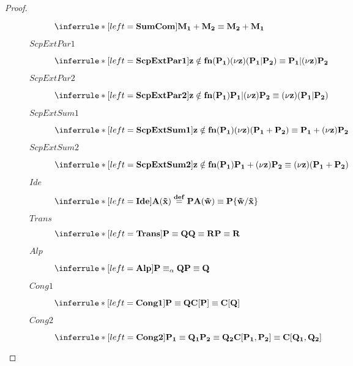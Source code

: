 \begin{proposition}
\begin{proof}
\begin{description}
\begin{description}
		$\inferrule* [left=\bf{SumCom}]{}{M_{1}+M_{2}\equiv M_{2}+M_{1}}$
	      \item[$ScpExtPar1$]
		$\inferrule* [left=\bf{ScpExtPar1}]{z\notin fn(P_{1})}{(\nu z) (P_{1}|P_{2}) \equiv P_{1}|(\nu z) P_{2}}$
	      \item[$ScpExtPar2$]
		$\inferrule* [left=\bf{ScpExtPar2}]{z\notin fn(P_{1})}{P_{1}|(\nu z) P_{2} \equiv (\nu z) (P_{1}|P_{2})}$ 
	      \item[$ScpExtSum1$]
		$\inferrule* [left=\bf{ScpExtSum1}]{z\notin fn(P_{1})}{(\nu z) (P_{1}+P_{2}) \equiv P_{1}+(\nu z) P_{2}}$
	      \item[$ScpExtSum2$]
		$\inferrule* [left=\bf{ScpExtSum2}]{z\notin fn(P_{1})}{P_{1}+(\nu z) P_{2} \equiv (\nu z) (P_{1}+P_{2})}$ 
	      \item[$Ide$]
		$\inferrule* [left=\bf{Ide}]{A(\tilde{x})\stackrel{def}{=}P}{A(\tilde{w})\equiv P\{\tilde{w}/\tilde{x}\}}$
	      \item[$Trans$]
		$\inferrule* [left=\bf{Trans}]{P \equiv Q \\ Q \equiv R}{P \equiv R}$
	      \item[$Alp$]
		$\inferrule* [left=\bf{Alp}] {
		  P \equiv_{\alpha} Q
		}{
		  P\equiv Q
		}$
	      \item[$Cong1$]
		$\inferrule* [left=\bf{Cong1}]{P \equiv Q}{C[P] \equiv C[Q]}$
	      \item[$Cong2$]
		$\inferrule* [left=\bf{Cong2}]{P_{1} \equiv Q_{1} \\ P_{2} \equiv Q_{2}}{C[P_{1}, P_{2}] \equiv C[Q_{1}, Q_{2}]}$
	    \end{description}
    \end{description}
  \end{proof}
\end{proposition}

